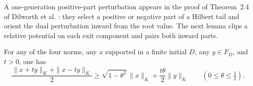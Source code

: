 A one-generation positive-part perturbation appears in the proof of
Theorem~2.4 of Dilworth et al. \cite{DKRRZ2016}: they select a positive
or negative part of a Hilbert tail and orient the dual perturbation
inward from the root value. The next lemma clips a relative potential
on each exit component and pairs both inward parts.

\begin{lemma}\label{thm:constrained-paired}
For any of the four norms, any $x$ supported in a finite initial $D$,
any $y\in F_D$, and $t>0$, one has
\begin{equation}\label{eq:pair-inequality}
 \frac{\|x+ty\|_K+\|x-ty\|_K}{2}
 \ge \sqrt{1-\theta^2}\,\|x\|_K
       +\frac{t\theta}{2}\|y\|_K
       \qquad(0\le\theta\le\tfrac12).
\end{equation}
\end{lemma}


